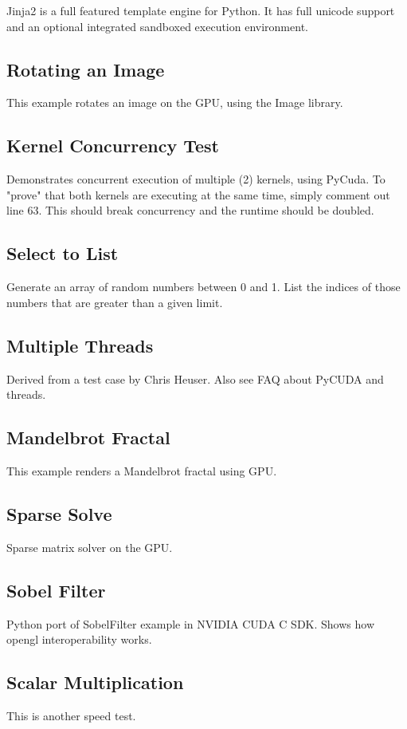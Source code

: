 \documentclass[article,A4,12pt]{llncs}
\begin{document}
Jinja2 is a full featured template engine for Python. It has full unicode support and
an optional integrated sandboxed execution environment.

\subsection{Rotating an Image}

This example rotates an image on the GPU, using the Image library.

\subsection{Kernel Concurrency Test}

Demonstrates concurrent execution of multiple (2) kernels, using PyCuda. 
To "prove" that both kernels are executing at the same time, simply comment 
out line 63. This should break concurrency and the runtime should be doubled.

\subsection{Select to List}

Generate an array of random numbers between 0 and 1.
List the indices of those numbers that are greater than a given limit.

\subsection{Multiple Threads}

Derived from a test case by Chris Heuser.
Also see FAQ about PyCUDA and threads.

\subsection{Mandelbrot Fractal}

This example renders a Mandelbrot fractal using GPU.

\subsection{Sparse Solve}

Sparse matrix solver on the GPU.

\subsection{Sobel Filter}

Python port of SobelFilter example in NVIDIA CUDA C SDK. Shows how opengl interoperability works.

\subsection{Scalar Multiplication}

This is another speed test.
\end{document}
